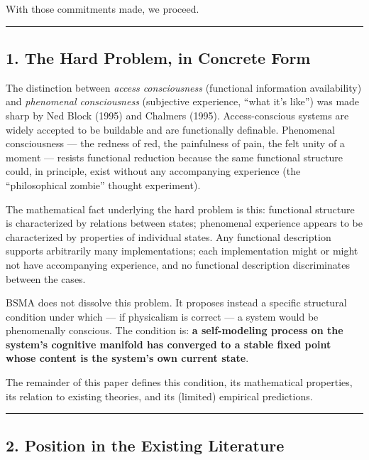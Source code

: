 \documentclass[
  11pt,
  a4paper,
]{article}
\begin{document}
With those commitments made, we proceed.

\begin{center}\rule{0.5\linewidth}{0.5pt}\end{center}

\subsection{1. The Hard Problem, in Concrete
Form}\label{the-hard-problem-in-concrete-form}

The distinction between \emph{access consciousness} (functional
information availability) and \emph{phenomenal consciousness}
(subjective experience, ``what it's like'') was made sharp by Ned Block
(1995) and Chalmers (1995). Access-conscious systems are widely accepted
to be buildable and are functionally definable. Phenomenal consciousness
--- the redness of red, the painfulness of pain, the felt unity of a
moment --- resists functional reduction because the same functional
structure could, in principle, exist without any accompanying experience
(the ``philosophical zombie'' thought experiment).

The mathematical fact underlying the hard problem is this: functional
structure is characterized by relations between states; phenomenal
experience appears to be characterized by properties of individual
states. Any functional description supports arbitrarily many
implementations; each implementation might or might not have
accompanying experience, and no functional description discriminates
between the cases.

BSMA does not dissolve this problem. It proposes instead a specific
structural condition under which --- if physicalism is correct --- a
system would be phenomenally conscious. The condition is: \textbf{a
self-modeling process on the system's cognitive manifold has converged
to a stable fixed point whose content is the system's own current
state}.

The remainder of this paper defines this condition, its mathematical
properties, its relation to existing theories, and its (limited)
empirical predictions.

\begin{center}\rule{0.5\linewidth}{0.5pt}\end{center}

\subsection{2. Position in the Existing
Literature}\label{position-in-the-existing-literature}
\end{document}
